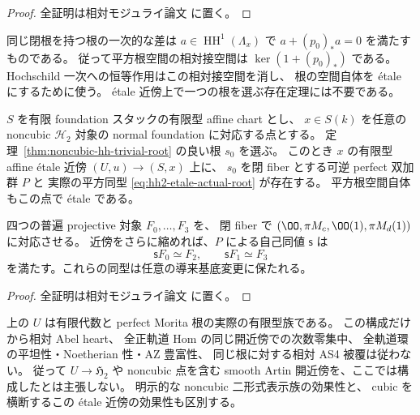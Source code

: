 \begin{proof}
全証明は相対モジュライ論文 \cite[\texttt{noncubic_hh_roots}]{QuadricModuli2026} に置く。
\end{proof}

\begin{remark}
\label{rem:hh2-etale-root-tangent}
同じ閉根を持つ根の一次的な差は
$a\in\operatorname{HH}^1(\Lambda_x)$ で
$a+(p_0)_*a=0$ を満たすものである。
従って平方根空間の相対接空間は
$\ker(1+(p_0)_*)$ である。
Hochschild 一次への恒等作用はこの相対接空間を消し、
根の空間自体を étale にするために使う。
étale 近傍上で一つの根を選ぶ存在定理には不要である。
\end{remark}

\begin{corollary}
\label{cor:noncubic-etale-morita-root}
$S$ を有限 foundation スタックの有限型 affine chart とし、
$x\in S(k)$ を任意の noncubic $\mathcal H_2$ 対象の
normal foundation に対応する点とする。
定理~\ref{thm:noncubic-hh-trivial-root} の良い根 $s_0$ を選ぶ。
このとき $x$ の有限型 affine étale 近傍 $(U,u)\to(S,x)$ 上に、
$s_0$ を閉 fiber とする可逆 perfect 双加群 $P$ と
実際の平方同型 \eqref{eq:hh2-etale-actual-root} が存在する。
平方根空間自体もこの点で étale である。

四つの普遍 projective 対象 $F_0,\ldots,F_3$ を、
閉 fiber で
$(\OO,\pi M_c,\OO(1),\pi M_d(1))$ に対応させる。
近傍をさらに縮めれば、$P$ による自己同値 $\mathsf s$ は
\[
 \mathsf s F_0\simeq F_2,\qquad
 \mathsf s F_1\simeq F_3
 \tag{N-window}\label{eq:noncubic-etale-root-window}
\]
を満たす。これらの同型は任意の導来基底変更に保たれる。
\end{corollary}

\begin{proof}
全証明は相対モジュライ論文 \cite[\texttt{noncubic_hh_roots}]{QuadricModuli2026} に置く。
\end{proof}

\begin{remark}[有限型近傍でまだ結論していないこと]
\label{rem:noncubic-etale-root-scope}
上の $U$ は有限代数と perfect Morita 根の実際の有限型族である。
この構成だけから相対 Abel heart、
全正軌道 Hom の同じ開近傍での次数零集中、
全軌道環の平坦性・Noetherian 性・AZ 豊富性、
同じ根に対する相対 AS4 被覆は従わない。
従って $U\to\mathfrak H_2$ や
noncubic 点を含む smooth Artin 開近傍を、ここでは構成したとは主張しない。
明示的な noncubic 二形式表示族の効果性と、
cubic を横断するこの étale 近傍の効果性も区別する。
\end{remark}

